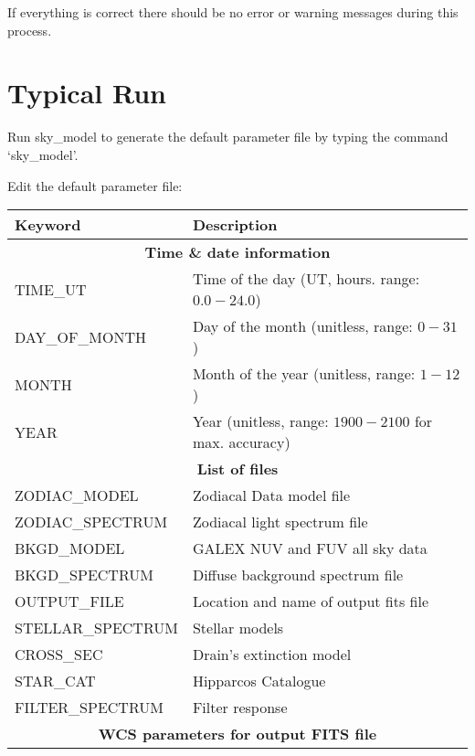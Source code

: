 \documentclass[12pt]{article}
\renewcommand{\i}{\item}
\def\i{\item}
\begin{document}
\begin{enumerate}
If everything is correct there should be no error or warning messages during this process.

\end{enumerate}

\section{Typical Run}
\newenvironment{small_listing}{\begin{enumerate}\itemsep 0.001pt}{\end{enumerate}}
\begin{small_listing}
\i Run sky\_model to generate the default parameter file by typing the command `sky\_model'.
\i Edit the default parameter file:

\begin{center}
\begin{tabular}{|l|l|}
\hline
\bf Keyword          &   \bf Description\\
\hline
\multicolumn{2}{|c|}{\bf Time \& date information}                        \\
\hline
TIME\_UT           &    Time of the day (UT, hours. range: $0.0 - 24.0$) \\
DAY\_OF\_MONTH      &  Day of the month (unitless, range: $0 - 31$) \\
MONTH             & Month of the year (unitless, range: $1 - 12$) \\
YEAR              & Year (unitless, range: $1900 - 2100$ for max. accuracy) \\
\hline
\multicolumn{2}{|c|}{\bf List of files}\\
\hline
ZODIAC\_MODEL      &  Zodiacal Data model file\\
ZODIAC\_SPECTRUM   &  Zodiacal light spectrum file\\
BKGD\_MODEL        &  GALEX NUV and FUV all sky data\\
BKGD\_SPECTRUM     &  Diffuse background spectrum file\\
OUTPUT\_FILE       &  Location and name of output fits file\\
STELLAR\_SPECTRUM  &  Stellar models\\
CROSS\_SEC         &  Drain's extinction model\\
STAR\_CAT          &  Hipparcos Catalogue\\
FILTER\_SPECTRUM   &  Filter response\\
\hline
\multicolumn{2}{|c|}{\bf WCS parameters for output FITS file}\\

\end{tabular}
\end{center}
\end{small_listing}
\end{document}
